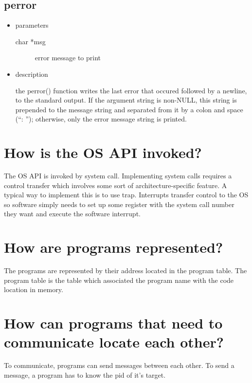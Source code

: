 \subsection{perror}
\begin{itemize}
\item{parameters}
\begin{description}
	\item[char *msg] error message to print
\end{description}
\item{description}

the perror() function writes the last error that occured followed by a newline, to
the standard output.  If the argument string is non-NULL, this string is prepended
to the message string and separated from it by a colon and space (``: ''); otherwise,
only the error message string is printed.
\end{itemize}

\section{How is the OS API invoked?}
The OS API is invoked by system call.
Implementing system calls requires a control transfer which involves some sort of architecture-specific feature.
A typical way to implement this is to use trap. Interrupts transfer control to the OS so 
software simply needs to set up some register with the system call number they want and execute the software interrupt.

\section{How are programs represented?}
The programs are represented by their address located in the program table.
The program table is the table which associated the program name with the code location in memory.

\section{How can programs that need to communicate locate each other?}
To communicate, programs can send messages between each other. To send a message, a program has to know
the pid of it's target.

